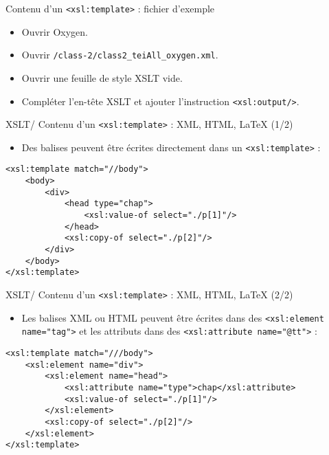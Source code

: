 \documentclass{beamer}
\begin{document}
     \begin{frame}{Contenu d'un \texttt{<xsl:template>} : fichier d'exemple}
         \Large
         \begin{itemize}
            \item Ouvrir Oxygen.
             \item Ouvrir \texttt{/class-2/class2\_teiAll\_oxygen.xml}.
             \item Ouvrir une feuille de style XSLT vide.
             \item Compléter l'en-tête XSLT et ajouter l'instruction \texttt{<xsl:output/>}.
         \end{itemize}
     \end{frame}

     \begin{frame}[fragile]{XSLT/ Contenu d'un \texttt{<xsl:template>} : XML, HTML, \LaTeX{} (1/2)}
     \Large
        \begin{itemize}
            \item Des balises peuvent être écrites directement dans un \texttt{<xsl:template>} :
        \end{itemize}
        \normalsize
         \begin{verbatim}
<xsl:template match="//body">
    <body>
        <div>
            <head type="chap">
                <xsl:value-of select="./p[1]"/>
            </head>
            <xsl:copy-of select="./p[2]"/>
        </div>
    </body>
</xsl:template>
         \end{verbatim}
     \end{frame}

     \begin{frame}[fragile]{XSLT/ Contenu d'un \texttt{<xsl:template>} : XML, HTML, \LaTeX{} (2/2)}
     \Large
        \begin{itemize}
            \item Les balises XML ou HTML peuvent être écrites dans des \texttt{<xsl:element name="tag">} et les attributs dans des \texttt{<xsl:attribute name="@tt">} :
        \end{itemize}
        \normalsize
         \begin{verbatim}
<xsl:template match="///body">
    <xsl:element name="div">
        <xsl:element name="head">
            <xsl:attribute name="type">chap</xsl:attribute>
            <xsl:value-of select="./p[1]"/>
        </xsl:element>
        <xsl:copy-of select="./p[2]"/>
    </xsl:element>
</xsl:template>
         \end{verbatim}
     \end{frame}
\end{document}
